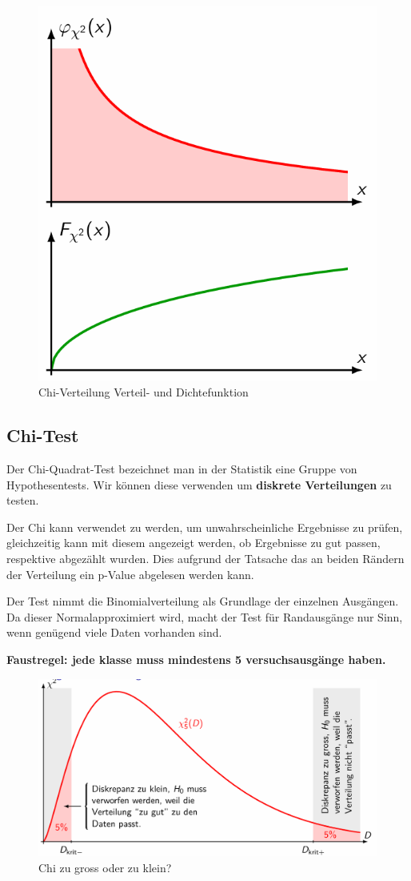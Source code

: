 \documentclass[../Main.tex]{subfiles}
\begin{document}
\begin{figure}[H]
    \centering
    \includegraphics[width=0.5\linewidth]{Images/chi-verteilung.png}
    \caption{Chi-Verteilung Verteil- und Dichtefunktion}
\end{figure}

\subsection{Chi-Test}
Der Chi-Quadrat-Test bezeichnet man in der Statistik eine Gruppe von Hypothesentests.
Wir können diese verwenden um \textbf{diskrete Verteilungen} zu testen.

Der Chi kann verwendet zu werden, um unwahrscheinliche Ergebnisse zu prüfen,
gleichzeitig kann mit diesem angezeigt werden, ob Ergebnisse zu gut passen,
respektive abgezählt wurden. Dies aufgrund der Tatsache das an beiden Rändern
der Verteilung ein p-Value abgelesen werden kann.

Der Test nimmt die Binomialverteilung als Grundlage der einzelnen Ausgängen.
Da dieser Normalapproximiert wird, macht der Test für Randausgänge nur Sinn,
wenn genügend viele Daten vorhanden sind.

\textbf{Faustregel: jede klasse muss mindestens 5 versuchsausgänge haben.}

\begin{figure}[H]
    \centering
    \includegraphics[width=1\linewidth]{Images/chi-gross-klein.png}
    \caption{Chi zu gross oder zu klein?}
\end{figure}
\end{document}

